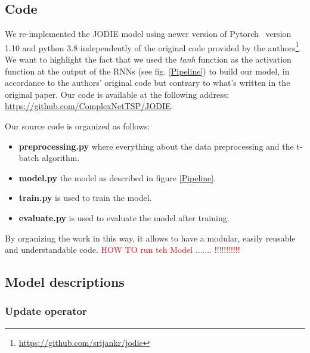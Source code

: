 


\subsection*{Code}
We re-implemented the JODIE model using newer version of Pytorch~\cite{NEURIPS2019_bdbca288} version 1.10 and python 3.8 independently of the original code provided by the authors\footnote{\url{https://github.com/srijankr/jodie}}. We want to highlight the fact that we used the \textit{tanh} function  as the activation function at the output of the RNNs (see fig. \ref{Pipeline}) to build our model,  in accordance to the authors' original code but contrary to what's written in the original paper. Our code is available at the following address: \url{https://github.com/ComplexNetTSP/JODIE}. 

Our source code is organized as follows:
\begin{itemize}
    \item \textbf{preprocessing.py} where everything about the data preprocessing and the t-batch algorithm.
    \item \textbf{model.py} the model as described in figure \ref{Pipeline}.
    \item \textbf{train.py} is used to train the model.
    \item \textbf{evaluate.py} is used to evaluate the model after training.
\end{itemize}
By organizing the work in this way, it allows to have a modular, easily reusable and understandable code.
\textcolor{red}{HOW TO run teh Model ....... !!!!!!!!!!!}
\subsection*{Model descriptions}

\subsubsection{Update operator}

